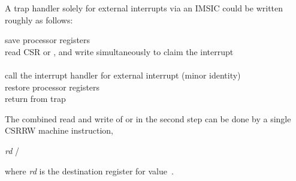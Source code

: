 A trap handler solely for external interrupts via an IMSIC could be
written roughly as follows:
\begin{displayLinesTable}
save processor registers \\
read CSR  or , and write simultaneously to
 claim the interrupt \\
 \\
call the interrupt handler for external interrupt  (minor identity) \\
restore processor registers \\
return from trap \\
\end{displayLinesTable}

The combined read and write of  or  in the second
step can be done by a single CSRRW machine instruction,
\begin{displayLinesTable}
\textit{rd}\z{,} /  \\
\end{displayLinesTable}
where \textit{rd} is the destination register for value~.

